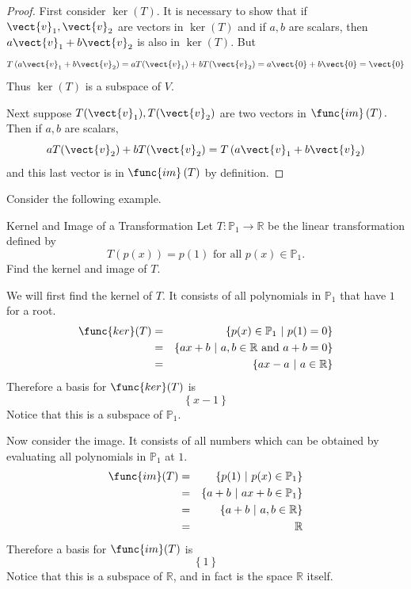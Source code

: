 \begin{proof}
First consider $\ker \left( T\right) .$ It is necessary to
show that if $\vect{v}_{1},\vect{v}_{2}$ are vectors in $\ker \left( T\right) $
and if $a,b$ are scalars, then $a\vect{v}_{1}+b\vect{v}_{2}$ is also in $\ker
\left( T\right) .$ But 
\begin{equation*}
T\left( a\vect{v}_{1}+b\vect{v}_{2}\right) =aT(\vect{v}_{1})+bT(\vect{v}_{2})=a\vect{0}+b\vect{0}=\vect{0}
\end{equation*}
Thus $\ker \left( T\right) $ is a subspace of $V$.

Next suppose $T(\vect{v}_{1}),T(\vect{v}_{2})$ are two vectors in $\func{im}\left(
T\right) .$ Then if $a,b$ are scalars, 
\begin{equation*}
aT(\vect{v}_{2})+bT(\vect{v}_{2})=T\left( a\vect{v}_{1}+b\vect{v}_{2}\right)
\end{equation*}
and this last vector is in $\func{im}\left( T\right) $ by definition. 
\end{proof}

Consider the following example.

\begin{example}{Kernel and Image of a Transformation}\label{exa:kernelimage}
Let $T:\mathbb{P}_1\to\mathbb{R}$ be the linear transformation defined by
\[ T(p(x))=p(1)\mbox{ for all } p(x)\in \mathbb{P}_1.\]
Find the kernel and image of $T$.
\end{example}

\begin{solution}
We will first find the kernel of $T$. It consists of all polynomials in $\mathbb{P}_1$ that have $1$ for a root. 
\begin{eqnarray*}
\func{ker}(T) & = & \{ p(x)\in \mathbb{P}_1 ~|~ p(1)=0\} \\
& = & \{ ax+b ~|~ a,b\in\mathbb{R} \mbox{ and }a+b=0\} \\
& = & \{ ax-a ~|~ a\in\mathbb{R} \}
\end{eqnarray*}
Therefore a basis for $\func{ker}(T)$ is 
\[
\left\{ x-1 \right\}
\]
Notice that this is a subspace of $\mathbb{P}_1$. 

Now consider the image. It consists of all numbers which can be obtained by evaluating all polynomials in $\mathbb{P}_1$ at $1$. 
\begin{eqnarray*}
\func{im}(T) & = & \{ p(1) ~|~ p(x)\in \mathbb{P}_1 \} \\
 & = & \{ a+b ~|~ ax+b\in \mathbb{P}_1 \} \\
 & = & \{ a+b ~|~ a,b\in\mathbb{R} \}\\
 & = & \mathbb{R}
\end{eqnarray*}
Therefore a basis for $\func{im}(T)$ is 
\[
\left\{ 1 \right\}
\]
Notice that this is a subspace of $\mathbb{R}$, and in fact is the space $\mathbb{R}$ itself. 
\end{solution}

